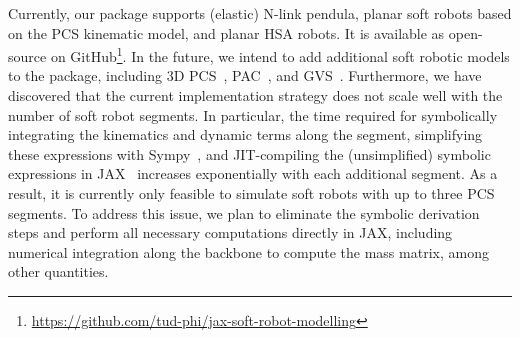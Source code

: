 Currently, our package supports (elastic) N-link pendula, planar soft robots based on the \gls{PCS} kinematic model, and planar \gls{HSA} robots. It is available as open-source on GitHub\footnote{\url{https://github.com/tud-phi/jax-soft-robot-modelling}}.
In the future, we intend to add additional soft robotic models to the package, including 3D \gls{PCS}~\citep{renda2018discrete}, \gls{PAC}~\citep{stella2023piecewise}, and \gls{GVS}~\citep{boyer2020dynamics}.
Furthermore, we have discovered that the current implementation strategy does not scale well with the number of soft robot segments. In particular, the time required for symbolically integrating the kinematics and dynamic terms along the segment, simplifying these expressions with Sympy~\citep{meurer2017sympy}, and JIT-compiling the (unsimplified) symbolic expressions in JAX~\citep{jax2018github} increases exponentially with each additional segment. As a result, it is currently only feasible to simulate soft robots with up to three \gls{PCS} segments. To address this issue, we plan to eliminate the symbolic derivation steps and perform all necessary computations directly in JAX, including numerical integration along the backbone to compute the mass matrix, among other quantities.

